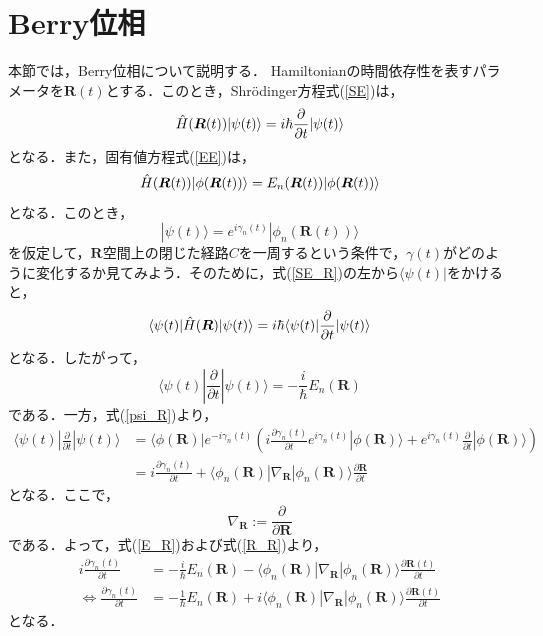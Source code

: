 \documentclass[a4paper, titlepage]{jsreport}
\begin{document}
\section{Berry位相}
本節では，Berry位相について説明する\cite{Berry1984}．
Hamiltonianの時間依存性を表すパラメータを$\bm{R}(t)$とする．このとき，Shr\"{o}dinger方程式(\ref{SE})は，
\begin{equation}
  \Hat{H}(\bm{R}(t)) |\psi(t) \rangle = i\hbar \frac{\partial}{\partial t} |\psi(t) \rangle \label{SE_R}
\end{equation}
となる．また，固有値方程式(\ref{EE})は，
\begin{equation}
  \Hat{H}(\bm{R}(t)) |\phi(\bm{R}(t)) \rangle = E_n(\bm{R}(t)) |\phi(\bm{R}(t)) \rangle \label{EE_R}
\end{equation}
となる．このとき，
\begin{equation}
  |\psi(t) \rangle = e^{i\gamma_n(t)} | \phi_n (\bm{R}(t)) \rangle \label{psi_R}
\end{equation}
を仮定して，$\bm{R}$空間上の閉じた経路$C$を一周するという条件で，$\gamma(t)$がどのように変化するか見てみよう．そのために，式(\ref{SE_R})の左から$\langle \psi(t) |$をかけると，
\begin{equation}
 \langle \psi(t) | \Hat{H}(\bm{R}) |\psi(t) \rangle = i\hbar \langle \psi(t) | \frac{\partial}{\partial t} |\psi(t) \rangle
\end{equation}
となる．したがって，
\begin{equation}
  \langle \psi(t) | \frac{\partial}{\partial t} |\psi(t) \rangle = -\frac{i}{\hbar} E_n(\bm{R})　\label{E_R}
\end{equation}
である．一方，式(\ref{psi_R})より，
\begin{align}
  \langle \psi(t) | \frac{\partial}{\partial t} |\psi(t) \rangle &=
  \langle \phi(\bm{R}) | e^{-i\gamma_n(t)} \left( i\frac{\partial \gamma_n(t)}{\partial t} e^{i\gamma_n(t)} |\phi(\bm{R}) \rangle + e^{i\gamma_n(t)} \frac{\partial}{\partial t} |\phi(\bm{R}) \rangle \right)\\
  &= i \frac{\partial \gamma_n(t)}{\partial t} + \langle \phi_n(\bm{R}) | \nabla_{\bm{R}} | \phi_n(\bm{R}) \rangle \frac{\partial \bm{R}}{\partial t} \label{R_R}
\end{align}
となる．ここで，
\begin{equation}
  \nabla_{\bm{R}} := \frac{\partial}{\partial \bm{R}}
\end{equation}
である．よって，式(\ref{E_R})および式(\ref{R_R})より，
\begin{align}
  i \frac{\partial \gamma_n(t)}{\partial t} &= 
  -\frac{i}{\hbar} E_n(\bm{R}) - \langle \phi_n(\bm{R}) | \nabla_{\bm{R}} | \phi_n(\bm{R}) \rangle \frac{\partial \bm{R}(t)}{\partial t}\\
  \Leftrightarrow
  \frac{\partial \gamma_n(t)}{\partial t} &=
  -\frac{1}{\hbar} E_n(\bm{R}) + i  \langle \phi_n(\bm{R}) | \nabla_{\bm{R}} | \phi_n(\bm{R}) \rangle \frac{\partial \bm{R}(t)}{\partial t}
\end{align}
となる．
\end{document}
